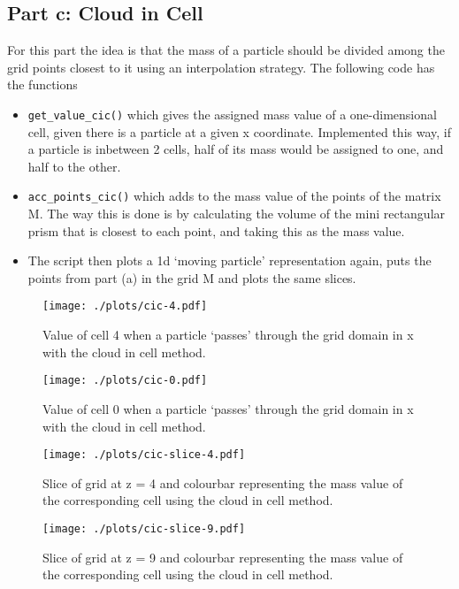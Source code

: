 \documentclass{article}
\begin{document}
\subsection{Part c: Cloud in Cell}
For this part the idea is that the mass of a particle should be divided among the grid points closest to it using an interpolation strategy. The following code has the functions
\begin{itemize}
    \item \verb+get_value_cic()+ which gives the assigned mass value of a one-dimensional cell, given there is a particle at a given x coordinate. Implemented this way, if a particle is inbetween 2 cells, half of its mass would be assigned to one, and half to the other.
    \item \verb+acc_points_cic()+ which adds to the mass value of the points of the matrix M. The way this is done is by calculating the volume of the mini rectangular prism that is closest to each point, and taking this as the mass value.
    \item The script then plots a 1d `moving particle' representation again, puts the points from part (a) in the grid M and plots the same slices.
\end{itemize}



\begin{figure}
    \centering
    \texttt{[image: ./plots/cic-4.pdf]}
    \caption{Value of cell 4 when a particle `passes' through the grid domain in x with the cloud in cell method.}
    \label{fig:cic4}
\end{figure}

\begin{figure}
    \centering
    \texttt{[image: ./plots/cic-0.pdf]}
    \caption{Value of cell 0 when a particle `passes' through the grid domain in x with the cloud in cell method.}
    \label{fig:cic0}
\end{figure}

\begin{figure}[h]
\centering
\begin{minipage}[t]{7.8cm}
    \centering
    \texttt{[image: ./plots/cic-slice-4.pdf]}
    \caption{Slice of grid at z = 4 and colourbar representing the mass value of the corresponding cell using the cloud in cell method.}
    \label{fig:cslice4}
\end{minipage}
\qquad
\begin{minipage}[t]{7.8cm}
    \centering
    \texttt{[image: ./plots/cic-slice-9.pdf]}
    \caption{Slice of grid at z = 9 and colourbar representing the mass value of the corresponding cell using the cloud in cell method.}
    \label{fig:cslice9}
\end{minipage}
\end{figure}
\end{document}
